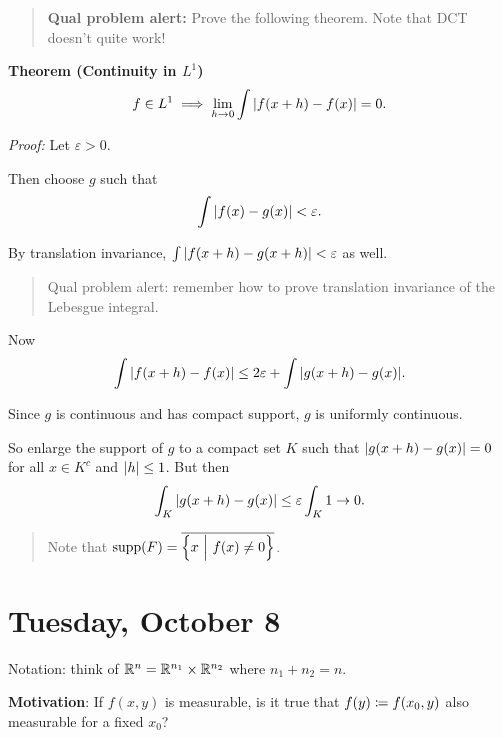 \begin{quote}
\textbf{Qual problem alert:} Prove the following theorem. Note that DCT
doesn't quite work!
\end{quote}

\textbf{Theorem (Continuity in \(L^1\))}
\begin{align*}
f\in L^1 \implies \lim_{h\to 0} \int {\left\lvert {f(x+h) - f(x)} \right\rvert} = 0
.\end{align*}

\emph{Proof:} Let \(\varepsilon > 0\).

Then choose \(g\) such that
\begin{align*}
\int{\left\lvert {f(x) - g(x)} \right\rvert} < \varepsilon
.\end{align*}

By translation invariance, \(\int{\left\lvert {f(x+h)- g(x+h)} \right\rvert} < \varepsilon\) as
well.

\begin{quote}
Qual problem alert: remember how to prove translation invariance of the
Lebesgue integral.
\end{quote}

Now
\begin{align*}
\int{\left\lvert {f(x+h) - f(x)} \right\rvert} \leq 2\varepsilon + \int{\left\lvert {g(x+h) - g(x)} \right\rvert}
.\end{align*}

Since \(g\) is continuous and has compact support, \(g\) is uniformly
continuous.

So enlarge the support of \(g\) to a compact set \(K\) such that
\({\left\lvert {g(x+h) - g(x)} \right\rvert} = 0\) for all \(x\in K^c\) and \({\left\lvert {h} \right\rvert} \leq 1\).
But then
\begin{align*}
\int_K {\left\lvert {g(x+h) - g(x)} \right\rvert} \leq \varepsilon \int_K 1 \to 0
.\end{align*}

\begin{quote}
Note that
\(\mathrm{supp}(F) = \overline{\left\{{x {~\mathrel{\Big|}~} f(x) \neq 0}\right\}}\).
\end{quote}

\hypertarget{tuesday-october-8}{%
\section{Tuesday, October 8}\label{tuesday-october-8}}

Notation: think of \({\mathbb{R}}^n = {\mathbb{R}}^{n_1} \times {\mathbb{R}}^{n_2}\) where
\(n_1 + n_2 = n\).

\textbf{Motivation}: If \(f(x,y)\) is measurable, is it true that
\(f(y) \coloneqq f(x_0, y)\) also measurable for a fixed \(x_0\)?

